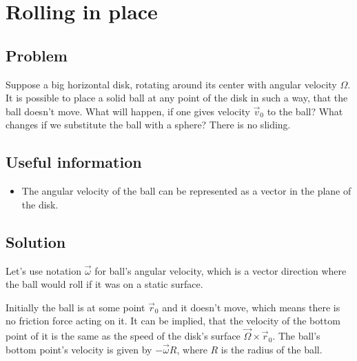 \section*{Rolling in place}

\subsection*{Problem}

Suppose a big horizontal disk,
rotating around its center with angular velocity $\Omega$.
It is possible to place a solid ball at any point of the disk
in such a way, that the ball doesn't move.
What will happen, if one gives velocity $\vec{v}_0$ to the ball?
What changes if we substitute the ball with a sphere?
There is no sliding.

\subsection*{Useful information}
\begin{itemize}
    \item The angular velocity of the ball can be represented as
        a vector in the plane of the disk.
\end{itemize}

\subsection*{Solution}

Let's use notation $\vec{\omega}$ for ball's angular velocity,
which is a vector direction where the ball would roll
if it was on a static surface.

Initially the ball is at some point $\vec{r}_0$ and it doesn't move,
which means there is no friction force acting on it.
It can be implied, that the velocity of the bottom point of it
is the same as the speed of the disk's surface $\vec{\Omega} \times \vec{r}_0$.
The ball's bottom point's velocity is given by $-\vec{\omega} R$,
where $R$ is the radius of the ball.

